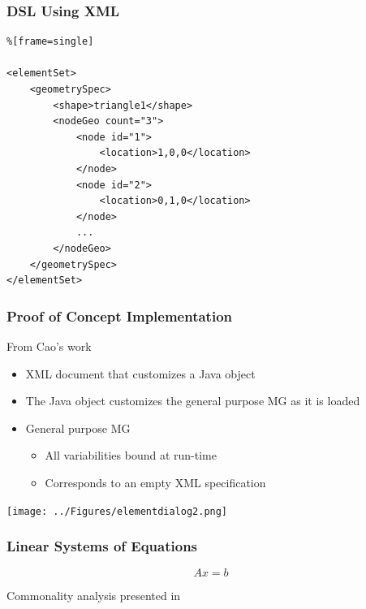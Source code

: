 \documentclass[t,12pt,numbers,fleqn]{beamer}
\begin{document}

\begin{frame}[fragile]

\frametitle{DSL Using XML}

\lstset{language=XML,linewidth=.9\textwidth,xleftmargin=0.5cm}
\begin{lstlisting}%[frame=single]

<elementSet>
    <geometrySpec>
        <shape>triangle1</shape>
        <nodeGeo count="3">
            <node id="1">
                <location>1,0,0</location>
            </node>
            <node id="2">
                <location>0,1,0</location>
            </node>
            ...
        </nodeGeo>
    </geometrySpec>
</elementSet>
\end{lstlisting}

\end{frame}


\begin{frame}

\frametitle{Proof of Concept Implementation}

From Cao's work \cite{Cao2006, SmithMcCutchanAndCao2007}
\begin{itemize}
\item XML document that customizes a Java object
\item The Java object customizes the general purpose MG as it is loaded
\item General purpose MG
\begin{itemize}
\item All variabilities bound at run-time
\item Corresponds to an empty XML specification
\end{itemize}
\end{itemize}

\begin{center}
{
\texttt{[image: ../Figures/elementdialog2.png]}
}
\end{center}

\end{frame}


\begin{frame}
\frametitle{Linear Systems of Equations}

$$A x = b$$

Commonality analysis presented in \cite{Smith2006}

\end{frame}
\end{document}
